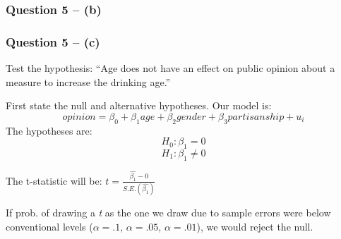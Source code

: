 \documentclass[xcolor=table]{beamer}
\begin{document}
\begin{frame}
\frametitle{Question 5 -- (b)}
\begin{table}[!htbp] 
\centering 
{}
\end{table} 
\end{frame}

\begin{frame}
\frametitle{Question 5 -- (c)}
Test the hypothesis: ``Age does not have an effect on public opinion about a measure to increase the drinking age.'' \pause

First state the null and alternative hypotheses. Our model is: $$opinion = \beta_0 + \beta_1 age + \beta_2 gender + \beta_3 partisanship + u_i$$ The hypotheses are: \pause
$$ H_0: \beta_1 = 0 $$ 
$$ H_1: \beta_1 \neq 0 $$

The t-statistic will be: \pause $t=\frac{\hat{\beta_1}-0}{S.E.(\hat{\beta_1})}$ \pause

If prob. of drawing a \emph{t} as the one we draw due to sample errors were below conventional levels ($\alpha=.1$, $\alpha=.05$, $\alpha=.01$), we would reject the null.
\end{frame}
\end{document}
